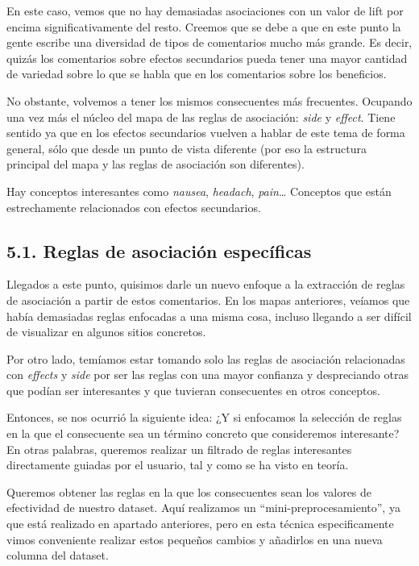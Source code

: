 \documentclass[spanish,]{article}
\begin{document}
En este caso, vemos que no hay demasiadas asociaciones con un valor de
lift por encima significativamente del resto. Creemos que se debe a que
en este punto la gente escribe una diversidad de tipos de comentarios
mucho más grande. Es decir, quizás los comentarios sobre efectos
secundarios pueda tener una mayor cantidad de variedad sobre lo que se
habla que en los comentarios sobre los beneficios.

No obstante, volvemos a tener los mismos consecuentes más frecuentes.
Ocupando una vez más el núcleo del mapa de las reglas de asociación:
\emph{side} y \emph{effect}. Tiene sentido ya que en los efectos
secundarios vuelven a hablar de este tema de forma general, sólo que
desde un punto de vista diferente (por eso la estructura principal del
mapa y las reglas de asociación son diferentes).

Hay conceptos interesantes como \emph{nausea}, \emph{headach},
\emph{pain}\ldots{} Conceptos que están estrechamente relacionados con
efectos secundarios.

\subsection{5.1. Reglas de asociación
específicas}\label{reglas-de-asociacion-especificas}

Llegados a este punto, quisimos darle un nuevo enfoque a la extracción
de reglas de asociación a partir de estos comentarios. En los mapas
anteriores, veíamos que había demasiadas reglas enfocadas a una misma
cosa, incluso llegando a ser difícil de visualizar en algunos sitios
concretos.

Por otro lado, temíamos estar tomando solo las reglas de asociación
relacionadas con \emph{effects} y \emph{side} por ser las reglas con una
mayor confianza y despreciando otras que podían ser interesantes y que
tuvieran consecuentes en otros conceptos.

Entonces, se nos ocurrió la siguiente idea: ¿Y si enfocamos la selección
de reglas en la que el consecuente sea un término concreto que
consideremos interesante? En otras palabras, queremos realizar un
filtrado de reglas interesantes directamente guiadas por el usuario, tal
y como se ha visto en teoría.

Queremos obtener las reglas en la que los consecuentes sean los valores
de efectividad de nuestro dataset. Aquí realizamos un
``mini-preprocesamiento'', ya que está realizado en apartado anteriores,
pero en esta técnica especificamente vimos conveniente realizar estos
pequeños cambios y añadirlos en una nueva columna del dataset.
\end{document}
